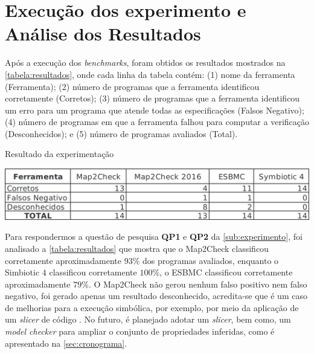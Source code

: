 \section{Execução dos experimento e Análise dos Resultados}

Após a execução dos \textit{benchmarks}, foram obtidos os resultados mostrados na \autoref{tabela:resultados}, onde cada linha da tabela contém: 
(1) nome da ferramenta (Ferramenta); 
(2) número de programas que a ferramenta identificou corretamente (Corretos); 
(3) número de programas que a ferramenta identificou um erro para um programa que atende todas as especificações (Falsos Negativo); 
(4) número de programas em que a ferramenta falhou para computar a verificação (Desconhecidos); e 
(5) número de programas avaliados (Total).

\begin{table}[H]
	\caption{\label{tabela:resultados} Resultado da experimentação}
	\begin{center}
	    \includegraphics[scale=0.33]{resources/tabelaResultados.png}
	\end{center}
\end{table}

Para respondermos a questão de pesquisa \textbf{QP1} e \textbf{QP2} da \autoref{sub:experimento}, foi analisado a \autoref{tabela:resultados} que mostra que o Map2Check classificou corretamente aproximadamente $93\%$ dos programas avaliados, enquanto o Simbiotic $4$  classificou corretamente  $100$\%, o ESBMC classificou corretamente  aproximadamente $79$\%. O Map2Check não gerou nenhum falso positivo nem falso negativo, foi gerado apenas um resultado desconhecido, acredita-se que é um caso de melhorias para a execução simbólica, por exemplo, por meio da aplicação de um \textit{slicer} de código \cite{Chalupa:2016}. 
No futuro, é planejado adotar um \textit{slicer}, bem como, um \textit{model checker} para ampliar o conjunto de propriedades inferidas, como é apresentado na \autoref{sec:cronograma}. 

